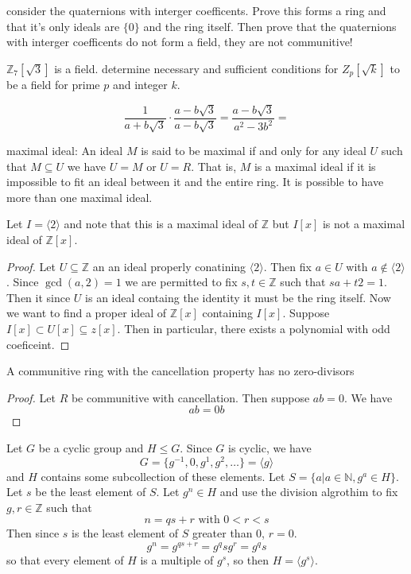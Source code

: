 \documentclass[11pt,largemargins]{homework}
\newcommand{\N}{\mathbb{N}}
\newcommand{\Z}{\mathbb{Z}}
\begin{document}
consider the quaternions with interger coefficents. Prove this forms a ring and that it's only ideals are $\{0\} $ and 
the ring itself. Then prove that the quaternions with interger coefficents do not form a field, they are not communitive! 

$\Z_7[\sqrt{3}]$ is a field. determine necessary and sufficient conditions for $Z_p[\sqrt{k}]$ to be a field for prime $p$ 
and integer $k$. 

\[\frac{1}{a + b \sqrt{3}} \cdot \frac{a - b \sqrt{3}}{a - b \sqrt{3}} = \frac{a - b \sqrt{ 3}}{a^2 - 3b^2} = \]

maximal ideal: 
An ideal $M$ is said to be maximal if and only for any ideal $U$ such that $M \subseteq U$
we have $U = M$ or $U = R$. That is, $M$ is a maximal ideal if it is impossible to fit an ideal between 
it and the entire ring. It is possible to have more than one maximal ideal. 


Let $I = \langle 2 \rangle $ and note that this is a maximal ideal of $\Z$ but $I[x]$ is not a maximal ideal 
of $\Z[x]$. 

\begin{proof}
    Let $U \subseteq \Z$ an an ideal properly conatining $\langle 2 \rangle$. Then fix $a \in U$ with $a \notin \langle 2 \rangle$. 
Since $\gcd(a, 2) = 1$ we are permitted to fix $s, t \in \Z$ such that $sa + t2 = 1$. Then it since $U$ is an ideal containg the identity 
it must be the ring itself. Now we want to find a proper ideal of $\Z[x]$ containing $I[x]$. Suppose $I[x] \subset U[x] \subseteq z[x]$. Then 
in particular, there exists a polynomial with odd coeficeint. 
\end{proof}



A communitive ring with the cancellation property has no zero-divisors 

\begin{proof}
    Let $R$ be communitive with cancellation. Then suppose $ab = 0$. 
    We have 
    \[ab = 0b \] 
    
\end{proof}

Let $G$ be a cyclic group and $H \leq G$. Since $G$ is cyclic, we have 
\[ G = \{g^{ - 1}, 0, g^{1}, g^{2}, \dots \} = \langle g \rangle\]
and $H$ contains some subcollection of these elements. Let $S = \{a | a \in \N, g^a \in H \}$. Let $s$ be the least 
element of $S$. Let $g^n \in H$ and use the division algrothim to fix $g, r \in \Z$ such that 
\[n = qs + r \text{ with } 0 < r < s\]
Then since $s$ is the least element of $S$ greater than 0, $r = 0$. 
\[g^n = g^{qs + r} = g^qs g^r = g^qs\]
so that every element of $H$ is a multiple of $g^s$, so then $H = \langle g^s \rangle$.
\end{document}

